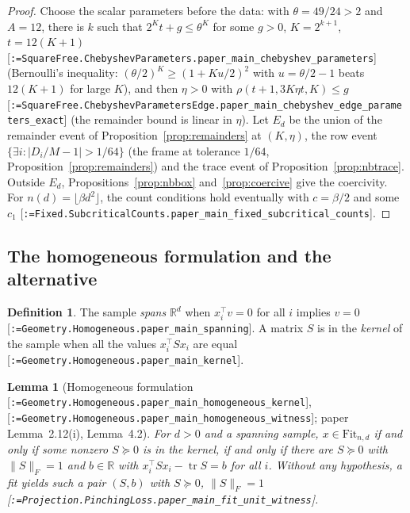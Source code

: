 \documentclass[11pt]{article}
\makeatletter
\newcommand{\formal@break}[1]{\@tfor\formal@tok:=#1\do{%
  \formal@tok
  \expandafter\ifx\formal@tok.\allowbreak\else
  \expandafter\ifx\formal@tok\_\allowbreak\fi\fi}}
\DeclareRobustCommand{\formal}[1]{\textnormal{[\texttt{\small\formal@break{#1}}]}}
\newcommand{\R}{\mathbb{R}}
\newcommand{\norm}[1]{\lVert #1\rVert}
\newcommand{\abs}[1]{\lvert #1\rvert}
\newcommand{\tr}{\operatorname{tr}}
\newcommand{\Fro}{F}
\newcommand{\Fit}{\mathrm{Fit}}
\theoremstyle{plain}
\newtheorem{lemma}[theorem]{Lemma}
\theoremstyle{definition}
\newtheorem{definition}[theorem]{Definition}
\makeatother
\begin{document}
\begin{proof}
Choose the scalar parameters before the data: with $\theta = 49/24 > 2$ and
$A = 12$, there is $k$ such that $2^Kt + g \le \theta^K$ for some $g > 0$,
$K = 2^{k+1}$, $t = 12(K+1)$ \formal{SquareFree.ChebyshevParameters.paper\_main\_chebyshev\_parameters}
(Bernoulli's inequality: $(\theta/2)^K \ge (1 + K u/2)^2$ with
$u = \theta/2 - 1$ beats $12(K+1)$ for large $K$), and then $\eta > 0$ with
$\rho(t+1, 3K\eta t, K) \le g$ \formal{SquareFree.ChebyshevParametersEdge.paper\_main\_chebyshev\_edge\_parameters\_exact}
(the remainder bound is linear in $\eta$). Let $E_d$ be the union of the
remainder event of Proposition~\ref{prop:remainders} at $(K, \eta)$, the row
event $\{\exists i : \abs{D_i/M - 1} > 1/64\}$ (the frame at tolerance
$1/64$, Proposition~\ref{prop:remainders}) and the trace event of
Proposition~\ref{prop:nbtrace}. Outside $E_d$, Propositions~\ref{prop:nbbox}
and~\ref{prop:coercive} give the coercivity. For $n(d) = \lfloor\beta d^2\rfloor$,
the count conditions hold eventually with $c = \beta/2$ and some $c_1$
\formal{Fixed.SubcriticalCounts.paper\_main\_fixed\_subcritical\_counts}.
\end{proof}

\subsection{The homogeneous formulation and the alternative}\label{sec:alternative}

\begin{definition}
The sample \emph{spans} $\R^d$ when $x_i^{\top}v = 0$ for all $i$ implies
$v = 0$ \formal{Geometry.Homogeneous.paper\_main\_spanning}. A matrix $S$
is in the \emph{kernel} of the sample when all the values $x_i^{\top}Sx_i$
are equal \formal{Geometry.Homogeneous.paper\_main\_kernel}.
\end{definition}

\begin{lemma}[Homogeneous formulation \formal{Geometry.Homogeneous.paper\_main\_homogeneous\_kernel}, \formal{Geometry.Homogeneous.paper\_main\_homogeneous\_witness}; paper Lemma~2.12(i), Lemma~4.2]\label{lem:homog}
For $d > 0$ and a spanning sample, $x \in \Fit_{n,d}$ if and only if some
nonzero $S \succeq 0$ is in the kernel, if and only if there are $S \succeq 0$
with $\norm{S}_\Fro = 1$ and $b \in \R$ with $x_i^{\top}Sx_i - \tr S = b$ for
all $i$. Without any hypothesis, a fit yields such a pair $(S, b)$ with
$S \succeq 0$, $\norm{S}_\Fro = 1$ \formal{Projection.PinchingLoss.paper\_main\_fit\_unit\_witness}.
\end{lemma}
\end{document}
